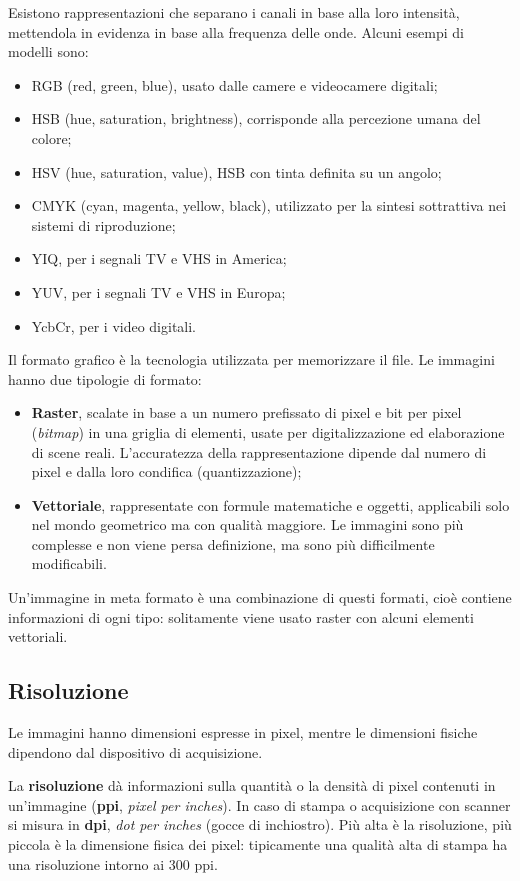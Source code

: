 Esistono rappresentazioni che separano i canali in base alla loro intensità, mettendola in evidenza in base alla frequenza delle onde. Alcuni esempi di modelli sono:
\begin{itemize}
	\item RGB (red, green, blue), usato dalle camere e videocamere digitali;
	\item HSB (hue, saturation, brightness), corrisponde alla percezione umana del colore;
	\item HSV (hue, saturation, value), HSB con tinta definita su un angolo;
	\item CMYK (cyan, magenta, yellow, black), utilizzato per la sintesi sottrattiva nei sistemi di riproduzione;
	\item YIQ, per i segnali TV e VHS in America;
	\item YUV, per i segnali TV e VHS in Europa;
	\item YcbCr, per i video digitali.
\end{itemize}

\newpage
Il formato grafico è la tecnologia utilizzata per memorizzare il file. Le immagini hanno due tipologie di formato: 
\begin{itemize}
	\item \textbf{Raster}, scalate in base a un numero prefissato di pixel e bit per pixel (\textit{bitmap}) in una griglia di elementi, usate per digitalizzazione ed elaborazione di scene reali. L'accuratezza della rappresentazione dipende dal numero di pixel e dalla loro condifica (quantizzazione);
	\item \textbf{Vettoriale}, rappresentate con formule matematiche e oggetti, applicabili solo nel mondo geometrico ma con qualità maggiore. Le immagini sono più complesse e non viene persa definizione, ma sono più difficilmente modificabili.
\end{itemize}
Un'immagine in meta formato è una combinazione di questi formati, cioè contiene informazioni di ogni tipo: solitamente viene usato raster con alcuni elementi vettoriali.

\subsection{Risoluzione}
Le immagini hanno dimensioni espresse in pixel, mentre le dimensioni fisiche dipendono dal dispositivo di acquisizione. 

La \textbf{risoluzione} dà informazioni sulla quantità o la densità di pixel contenuti in un'immagine (\textbf{ppi}, \textit{pixel per inches}). In caso di stampa o acquisizione con scanner si misura in \textbf{dpi}, \textit{dot per inches} (gocce di inchiostro). Più alta è la risoluzione, più piccola è la dimensione fisica dei pixel: tipicamente una qualità alta di stampa ha una risoluzione intorno ai 300 ppi.

